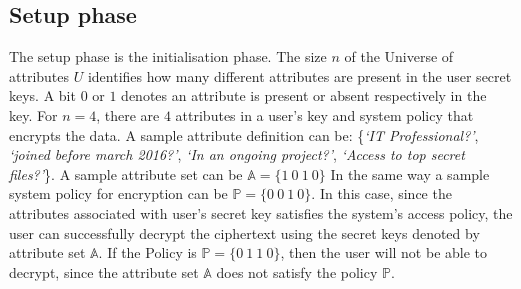 \documentclass[conference]{IEEEtran}
\begin{document}
\subsection{\textbf{Setup phase}}
The setup phase is the initialisation phase. The size $n$ of the Universe of attributes $U$ identifies how many different attributes are present in the user secret keys. A bit $0$ or $1$ denotes an attribute is present or absent respectively in the key.
For $n =4$, there are $4$ attributes in a user's key and system policy that encrypts the data. A sample attribute definition can be: \{\emph{‘IT Professional?’}, \emph{‘joined before march 2016?’}, \emph{‘In an ongoing project?’}, \emph{‘Access to top secret files?’}\}. A sample attribute set can be $\mathbb{A}   = \{1\ 0\ 1\ 0\}$ In the same way a sample system policy for encryption can be $\mathbb{P}  = \{0\ 0\ 1\ 0\}$. In this case, since the attributes associated with user's secret key satisfies the system's access policy, the user can successfully decrypt the ciphertext using the secret keys denoted by attribute set $\mathbb{A}$. If the Policy is $\mathbb{P} = \{0\ 1\ 1\ 0\}$, then the user will not be able to decrypt, since the attribute set $\mathbb{A}$ does not satisfy the policy $\mathbb{P}$.
\end{document}
